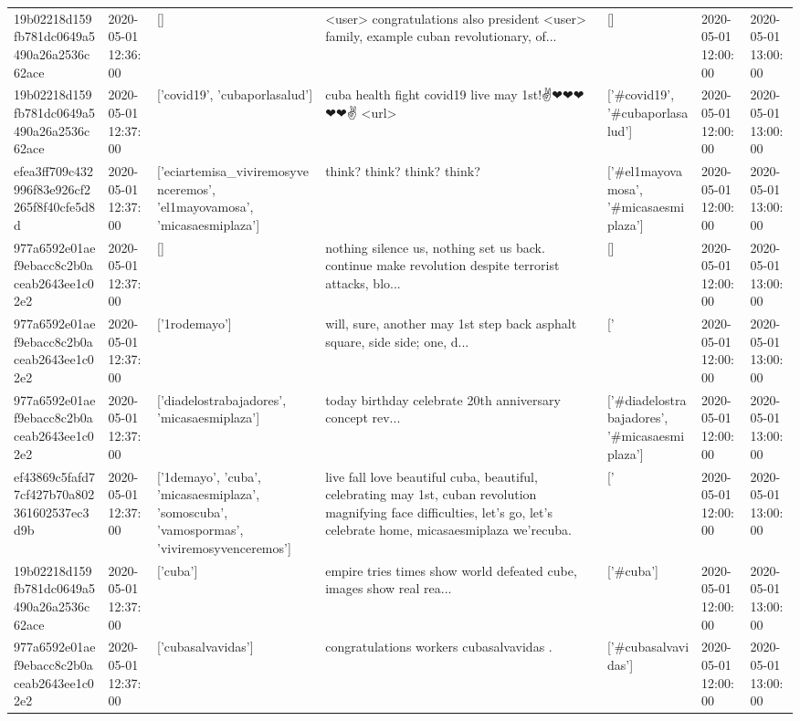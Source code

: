 \begin{tabular}{lllllll}
19b02218d159fb781dc0649a5490a26a2536c62ace & 2020-05-01 12:36:00 & [] & <user> congratulations also president <user> family, example cuban revolutionary, of... & [] & 2020-05-01 12:00:00 & 2020-05-01 13:00:00 \\
19b02218d159fb781dc0649a5490a26a2536c62ace & 2020-05-01 12:37:00 & ['covid19', 'cubaporlasalud'] & cuba health fight covid19 live may 1st!✌❤❤❤❤❤✌ <url> & ['#covid19', '#cubaporlasalud'] & 2020-05-01 12:00:00 & 2020-05-01 13:00:00 \\
efea3ff709c432996f83e926cf2265f8f40cfe5d8d & 2020-05-01 12:37:00 & ['eciartemisa_viviremosyvenceremos', 'el1mayovamosa', 'micasaesmiplaza'] & think? think? think? think? & ['#el1mayovamosa', '#micasaesmiplaza'] & 2020-05-01 12:00:00 & 2020-05-01 13:00:00 \\
977a6592e01aef9ebacc8c2b0aceab2643ee1c02e2 & 2020-05-01 12:37:00 & [] & nothing silence us, nothing set us back. continue make revolution despite terrorist attacks, blo... & [] & 2020-05-01 12:00:00 & 2020-05-01 13:00:00 \\
977a6592e01aef9ebacc8c2b0aceab2643ee1c02e2 & 2020-05-01 12:37:00 & ['1rodemayo'] & will, sure, another may 1st step back asphalt square, side side; one, d... & ['#1rodemayo'] & 2020-05-01 12:00:00 & 2020-05-01 13:00:00 \\
977a6592e01aef9ebacc8c2b0aceab2643ee1c02e2 & 2020-05-01 12:37:00 & ['diadelostrabajadores', 'micasaesmiplaza'] & today birthday celebrate 20th anniversary concept rev... & ['#diadelostrabajadores', '#micasaesmiplaza'] & 2020-05-01 12:00:00 & 2020-05-01 13:00:00 \\
ef43869c5fafd77cf427b70a802361602537ec3d9b & 2020-05-01 12:37:00 & ['1demayo', 'cuba', 'micasaesmiplaza', 'somoscuba', 'vamospormas', 'viviremosyvenceremos'] & live fall love beautiful cuba, beautiful, celebrating may 1st, cuban revolution magnifying face difficulties, let's go, let's celebrate home, micasaesmiplaza we'recuba. & ['#1demayo', '#cuba', '#micasaesmiplaza', '#somoscuba', '#viviremosyvenceremos'] & 2020-05-01 12:00:00 & 2020-05-01 13:00:00 \\
19b02218d159fb781dc0649a5490a26a2536c62ace & 2020-05-01 12:37:00 & ['cuba'] & empire tries times show world defeated cube, images show real rea... & ['#cuba'] & 2020-05-01 12:00:00 & 2020-05-01 13:00:00 \\
977a6592e01aef9ebacc8c2b0aceab2643ee1c02e2 & 2020-05-01 12:37:00 & ['cubasalvavidas'] & congratulations workers cubasalvavidas ️. & ['#cubasalvavidas'] & 2020-05-01 12:00:00 & 2020-05-01 13:00:00 \\

\end{tabular}
